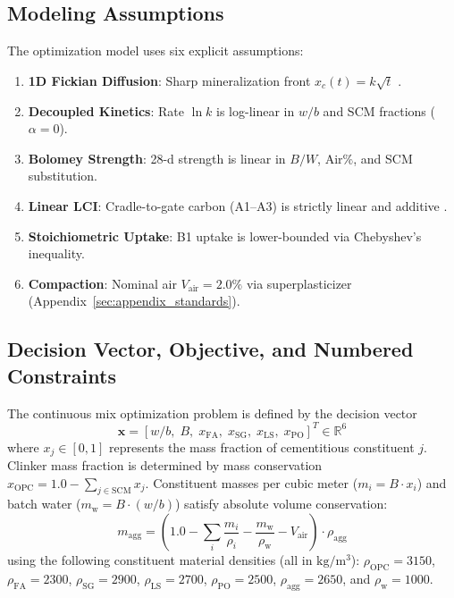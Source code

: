 \documentclass[journal]{IEEEtran}
\begin{document}
\subsection{Modeling Assumptions}
\noindent\begin{minipage}{\columnwidth}
The optimization model uses six explicit assumptions:
\begin{enumerate}\setlength{\itemsep}{0.5pt}\setlength{\parskip}{0pt}
    \item[\textbf{A1}] \textbf{1D Fickian Diffusion}: Sharp mineralization front $x_c(t) = k\sqrt{t}$ \cite{papadakis1991}.
    \item[\textbf{A2}] \textbf{Decoupled Kinetics}: Rate $\ln k$ is log-linear in $w/b$ and SCM fractions ($\alpha = 0$).
    \item[\textbf{A3}] \textbf{Bolomey Strength}: 28-d strength is linear in $B/W$, $\mathrm{Air}\%$, and SCM substitution.
    \item[\textbf{A4}] \textbf{Linear LCI}: Cradle-to-gate carbon (A1--A3) is strictly linear and additive \cite{ice3}.
    \item[\textbf{A5}] \textbf{Stoichiometric Uptake}: B1 uptake is lower-bounded via Chebyshev's inequality.
    \item[\textbf{A6}] \textbf{Compaction}: Nominal air $V_{\mathrm{air}} = 2.0\%$ via superplasticizer (Appendix~\ref{sec:appendix_standards}).
\end{enumerate}
\end{minipage}

\subsection{Decision Vector, Objective, and Numbered Constraints}
The continuous mix optimization problem is defined by the decision vector 
\[
\mathbf{x} = \left[ w/b, \; B, \; x_{\mathrm{FA}}, \; x_{\mathrm{SG}}, \; x_{\mathrm{LS}}, \; x_{\mathrm{PO}} \right]^T \in \mathbb{R}^6
\]
where $x_j \in [0, 1]$ represents the mass fraction of cementitious constituent $j$. Clinker mass fraction is determined by mass conservation $x_{\mathrm{OPC}} = 1.0 - \sum_{j \in \mathrm{SCM}} x_j$. Constituent masses per cubic meter ($m_i = B \cdot x_i$) and batch water ($m_{\mathrm{w}} = B \cdot (w/b)$) satisfy absolute volume conservation:
\begin{equation}
m_{\mathrm{agg}} = \left( 1.0 - \sum_i \frac{m_i}{\rho_i} - \frac{m_{\mathrm{w}}}{\rho_{\mathrm{w}}} - V_{\mathrm{air}} \right) \cdot \rho_{\mathrm{agg}}
\label{eq:agg_balance}
\end{equation}
using the following constituent material densities (all in $\mathrm{kg/m^3}$): $\rho_{\mathrm{OPC}} = 3150$, $\rho_{\mathrm{FA}} = 2300$, $\rho_{\mathrm{SG}} = 2900$, $\rho_{\mathrm{LS}} = 2700$, $\rho_{\mathrm{PO}} = 2500$, $\rho_{\mathrm{agg}} = 2650$, and $\rho_{\mathrm{w}} = 1000$.
\end{document}
